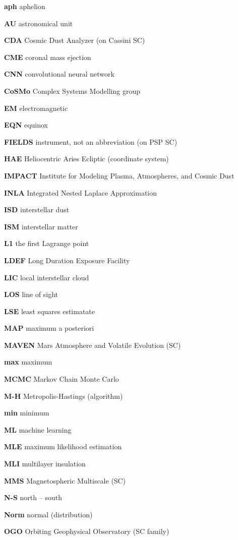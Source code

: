 \noindent

\textbf{aph} aphelion

\textbf{AU} astronomical unit

\textbf{CDA} Cosmic Dust Analyzer (on Cassini SC)

\textbf{CME} coronal mass ejection

\textbf{CNN} convolutional neural network

\textbf{CoSMo} Complex Systems Modelling group

\textbf{EM} electromagnetic

\textbf{EQN} equinox

\textbf{FIELDS} instrument, not an abbreviation (on PSP SC)

\textbf{HAE} Heliocentric Aries Ecliptic (coordinate system)

\textbf{IMPACT} Institute for Modeling Plasma, Atmospheres, and Cosmic Dust

\textbf{INLA} Integrated Nested Laplace Approximation

\textbf{ISD} interstellar dust

\textbf{ISM} interstellar matter

\textbf{L1} the first Lagrange point

\textbf{LDEF} Long Duration Exposure Facility

\textbf{LIC} local interstellar cloud

\textbf{LOS} line of sight

\textbf{LSE} least squares estimatate

\textbf{MAP} maximum a posteriori

\textbf{MAVEN}  Mars Atmosphere and Volatile Evolution (SC)

\textbf{max} maximum

\textbf{MCMC} Markov Chain Monte Carlo

\textbf{M-H} Metropolis-Hastings (algorithm)

\textbf{min} minimum

\textbf{ML} machine learning

\textbf{MLE} maximum likelihood estimation

\textbf{MLI} multilayer insulation

\textbf{MMS} Magnetospheric Multiscale (SC)

\textbf{N-S} north -- south

\textbf{Norm} normal (distribution) 

\textbf{OGO} Orbiting Geophysical Observatory (SC family)

